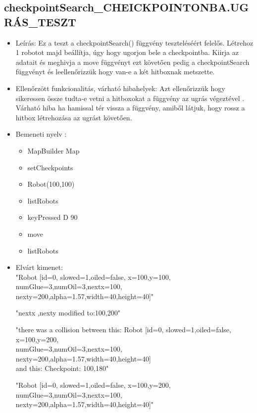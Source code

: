 \subsection{checkpointSearch\_CHEICKPOINTONBA.UGRÁS\_TESZT}
\begin{itemize}
	\item Leírás: Ez a teszt a checkpointSearch() függvény teszteléséért felelős.
			Létrehoz 1 robotot majd beállítja, úgy hogy ugorjon bele a checkpointba.
			Kiirja az adatait  és meghivja a move függvényt ezt követően pedig a checkpointSearch függvényt és leellenőrizzük hogy van-e a két hitboxnak metszette.\newline
	\item Ellenőrzött funkcionalitás, várható hibahelyek: Azt ellenőrizzük hogy sikeressen össze tudta-e vetni a hitboxokat a függvény az ugrás                     végeztével .
	        Várható hiba ha hamissal tér vissza a függvény, amiből látjuk, hogy rossz a hitbox létrehozása  az ugrást követően.
	\item Bemeneti nyelv :
		\begin{itemize}
        \item MapBuilder Map
        \item setCheckpoints 
		\item Robot(100,100)
		\item listRobots
		\item keyPressed D 90
		\item move
		\item listRobots
		\end{itemize}

	\item Elvárt kimenet: \\
		"Robot [id=0,  slowed=1,oiled=false, x=100,y=100, 
		\\numGlue=3,numOil=3,nextx=100,
		\\nexty=200,alpha=1.57,width=40,height=40]"\newline
		
		"nextx ,nexty modified to:100,200"\newline
		
		 "there was a collision between this: Robot [id=0,  slowed=1,oiled=false, x=100,y=200, 
		\\numGlue=3,numOil=3,nextx=100,
		\\nexty=200,alpha=1.57,width=40,height=40]
		\\and this: 
		  Checkpoint: 100,180"\newline
	
		 "Robot [id=0,  slowed=1,oiled=false, x=100,y=200, 
		\\numGlue=3,numOil=3,nextx=100,
		\\nexty=200,alpha=1.57,width=40,height=40]"\newline
	
\end{itemize}
\pagebreak
